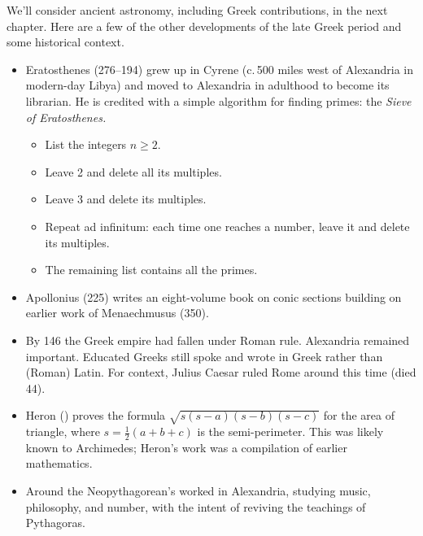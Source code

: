 \label{pg:eratosthenes}

We'll consider ancient astronomy, including Greek contributions, in the next chapter. Here are a few of the other developments of the late Greek period and some historical context.

\begin{itemize}\itemsep1pt
  \item Eratosthenes (276--194\BC) grew up in Cyrene (c.\,500 miles west of Alexandria in modern-day Libya) and moved to Alexandria in adulthood to become its librarian. He is credited with a simple algorithm for finding primes: the \emph{Sieve of Eratosthenes.}
  \begin{itemize}
    \item List the integers $n\ge 2$.
    \item Leave 2 and delete all its multiples.
    \item Leave 3 and delete its multiples.
    \item Repeat ad infinitum: each time one reaches a number, leave it and delete its multiples.
    \item The remaining list contains all the primes. 
  \end{itemize}

  \item Apollonius (225\BC) writes an eight-volume book on conic sections building on earlier work of Menaechmusus (350\BC).
  
  \item By 146\BC{} the Greek empire had fallen under Roman rule. Alexandria remained important. Educated Greeks still spoke and wrote in Greek rather than (Roman) Latin. For context, Julius Caesar ruled Rome around this time (died 44\BC).
  
  \item Heron () proves the formula $\sqrt{s(s-a)(s-b)(s-c)}$ for the area of triangle, where $s=\frac 12(a+b+c)$ is the semi-perimeter. This was likely known to Archimedes; Heron's work was a compilation of earlier mathematics.
  
  \item Around  the Neopythagorean's worked in Alexandria, studying music, philosophy, and number, with the intent of reviving the teachings of Pythagoras.
  

\end{itemize}
